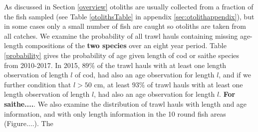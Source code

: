 \documentclass[a4paper 12pt]{article}
\numberwithin{equation}{section}
\begin{document}

As discussed in Section \ref{overview} otoliths are usually collected from a fraction of the fish sampled (see Table \ref{otolithsTable} in appendix \ref{sec:otolithappendix}), but in some cases only a small number of fish are caught so otoliths are taken from all catches. We examine the probability of all trawl hauls containing missing age-length compositions of the {\bf two species} over an eight year period. Table \ref{probability} gives the probability of age given length of cod or saithe species from 2010-2017. In 2015, $89\%$ of the trawl hauls with at least one length observation of length $l$ of cod, had also an age observation for length $l$, and if we further condition that $l>50$ cm, at least $93\%$ of trawl hauls with at least one length observation of length $l$, had also an age observation for length $l$. {\bf For saithe....}. We also examine the distribution of trawl hauls with length and age information, and with only length information in the 10 round fish areas (Figure....). The  \\
\end{document}
